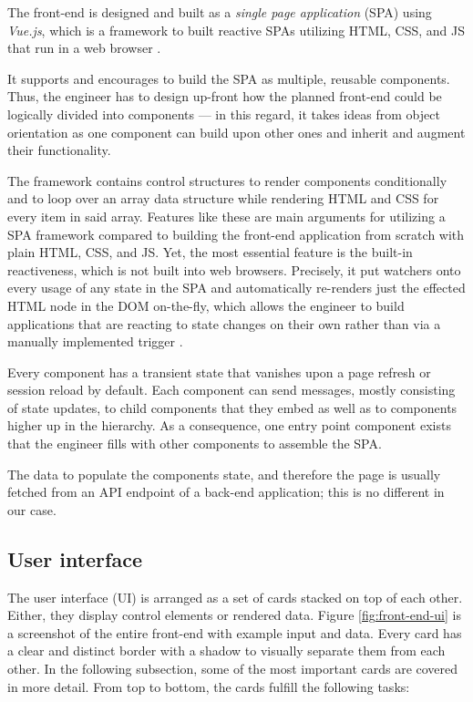 \documentclass[12pt,a4paper]{report}
\begin{document}
The front-end is designed and built as a \textit{single page application} (SPA)
using \textit{Vue.js}, which is a framework to built reactive SPAs utilizing
HTML, CSS, and JS that run in a web browser \cite{vuejs}.

It supports and encourages to build the SPA as multiple, reusable components.
Thus, the engineer has to design up-front how the planned front-end could be
logically divided into components --- in this regard, it takes ideas from
object orientation as one component can build upon other ones and inherit and
augment their functionality.

The framework contains control structures to render components conditionally
and to loop over an array data structure while rendering HTML and CSS for every
item in said array. Features like these are main arguments for utilizing a SPA
framework compared to building the front-end application from scratch with
plain HTML, CSS, and JS. Yet, the most essential feature is the built-in
reactiveness, which is not built into web browsers. Precisely, it put watchers
onto every usage of any state in the SPA and automatically re-renders just the
effected HTML node in the DOM on-the-fly, which allows the engineer to build
applications that are reacting to state changes on their own rather than via a
manually implemented trigger \cite{vuejs}.

Every component has a transient state that vanishes upon a page
refresh or session reload by default. Each component can send messages, mostly
consisting of state updates, to child components that they embed as well as to
components higher up in the hierarchy. As a consequence, one entry point
component exists that the engineer fills with other components to assemble the
SPA.

The data to populate the components state, and therefore the page is usually
fetched from an API endpoint of a back-end application; this is no different in
our case.


\subsection{User interface}

The user interface (UI) is arranged as a set of cards stacked on top of each
other. Either, they display control elements or rendered data. Figure \ref{fig:front-end-ui}
is a screenshot of the entire front-end with example input and data.
Every card has a clear and distinct border with a shadow to visually
separate them from each other. In the following subsection, some of the most
important cards are covered in more detail. From top to bottom, the cards
fulfill the following tasks:
\end{document}
